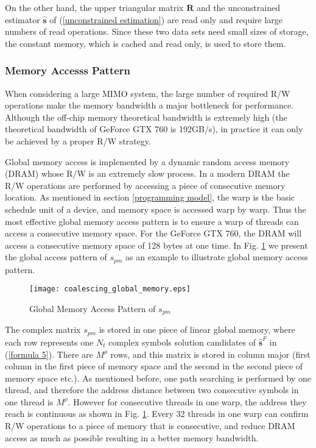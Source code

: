 \documentclass[letterpaper, 10pt, conference]{ieeeconf}
\begin{document}
On the other hand, the upper triangular matrix $\mathbf{R}$ and the unconstrained estimator $\mathbf{\hat{s}}$ of (\ref{unconstrained estimation}) are read only and require large numbers of read operations. Since these two data sets need small sizes of storage, the constant memory, which is cached and read only, is used to store them.
\subsubsection{Memory Accesss Pattern}
When considering a large MIMO system, the large number of required R/W operations make the memory bandwidth a major bottleneck for performance. Although the off-chip memory theoretical bandwidth is extremely high (the theoretical bandwidth of GeForce GTX 760 is 192GB/s), in practice it can only be achieved by a proper R/W strategy.

Global memory access is implemented by a dynamic random access memory (DRAM) whose R/W is an extremely slow process. In a modern DRAM the R/W operations are performed by accessing a piece of consecutive memory location. As mentioned in section \ref{programming model}, the warp is the basic schedule unit of a device, and memory space is accessed warp by warp. Thus the most effective global memory access pattern is to ensure a warp of threads can access a consecutive memory space. For the GeForce GTX 760, the DRAM will access a consecutive memory space of 128 bytes at one time. In Fig. \ref{coalesce global memory} we present the global access pattern of $\mathit{s_{pm}}$ as an example to illustrate global memory access pattern.
\begin{figure}[htb]
\centering
\texttt{[image: coalescing\_global\_memory.eps]}
\caption{Global Memory Access Pattern of $\mathit{s_{pm}}$}
\label{coalesce global memory}
\end{figure}


The complex matrix $\mathit{s_{pm}}$ is stored in one piece of linear global memory, where each row represents one $N_{t}$ complex symbols solution candidates of $\mathbf{\hat{s}}^{F}$ in (\ref{formula 5}). There are $M^{\rho}$ rows, and this matrix is stored in column major (first column in the first piece of memory space and the second in the second piece of memory space etc.). As mentioned before, one path searching is performed by one thread, and therefore the address distance between two consecutive symbols in one thread is $M^{\rho}$. However for consecutive threads in one warp, the address they reach is continuous as shown in Fig. \ref{coalesce global memory}. Every 32 threads in one warp can confirm R/W operations to a piece of memory that is consecutive, and reduce DRAM access as much as possible resulting in a better memory bandwidth.
\end{document}
